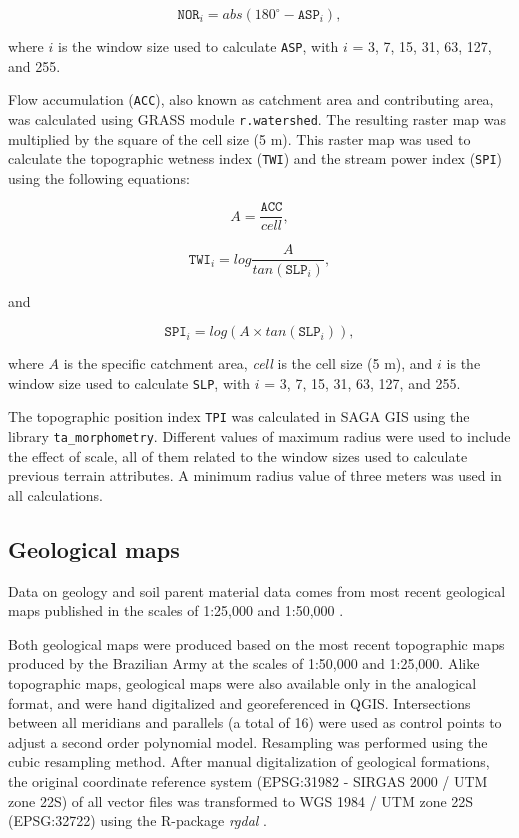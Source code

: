 \begin{equation}
  \texttt{NOR}_i = abs(180^\circ - \texttt{ASP}_i),
\end{equation}\label{eq:NOR}

\noindent where $i$ is the window size used to calculate \texttt{ASP}, with $i$ = 3, 7, 15, 31, 63, 127, and 255.   

Flow accumulation (\texttt{ACC}), also known as catchment area and contributing area, was calculated using GRASS module \texttt{r.watershed}. The resulting raster map was multiplied by the square of the cell size (5 m). This raster map was used to calculate the topographic wetness index (\texttt{TWI}) and the stream power index (\texttt{SPI}) using the following equations:

\begin{equation}
  A = \dfrac{\texttt{ACC}}{\textit{cell}},
\end{equation}\label{eq:sACC}

\begin{equation}
  \texttt{TWI}_i = log \dfrac{A}{tan(\texttt{SLP}_i)},
\end{equation}\label{eq:TWI}

\noindent and

\begin{equation}
  \texttt{SPI}_i = log(A \times tan(\texttt{SLP}_i)),
\end{equation}\label{eq:SPI}

\noindent where $A$ is the specific catchment area, \textit{cell} is the cell size (5 m), and $i$ is the window size used to calculate \texttt{SLP}, with $i$ = 3, 7, 15, 31, 63, 127, and 255.

The topographic position index \texttt{TPI} was calculated in SAGA GIS using the library \texttt{ta\_morphometry}. Different values of maximum radius were used to include the effect of scale, all of them related to the window sizes used to calculate previous terrain attributes. A minimum radius value of three meters was used in all calculations.

\tocless\subsection{Geological maps} 

Data on geology and soil parent material data comes from most recent geological maps published in the scales of 1:25,000 \citep{MacielFilho1990} and 1:50,000 \citep{GasparettoEtAl1988}.

Both geological maps were produced based on the most recent topographic maps produced by the Brazilian Army at the scales of 1:50,000 and 1:25,000. Alike topographic maps, geological maps were also available only in the analogical format, and were hand digitalized and georeferenced in QGIS. Intersections between all meridians and parallels (a total of 16) were used as control points to adjust a second order polynomial model. Resampling was performed using the cubic resampling method. After manual digitalization of geological formations, the original coordinate reference system (EPSG:31982 - SIRGAS 2000 / UTM zone 22S) of all vector files was transformed to WGS 1984 / UTM zone 22S (EPSG:32722) using the R-package \textit{rgdal} \citep{BivandEtAl2013a}.

